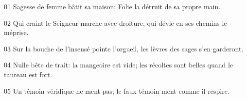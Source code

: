 01 Sagesse de femme bâtit sa maison; Folie la détruit de sa propre main.

02 Qui craint le Seigneur marche avec droiture, qui dévie en ses chemins le méprise.

03 Sur la bouche de l’insensé pointe l’orgueil, les lèvres des sages s’en garderont.

04 Nulle bête de trait: la mangeoire est vide; les récoltes sont belles quand le taureau est fort.

05 Un témoin véridique ne ment pas; le faux témoin ment comme il respire.

